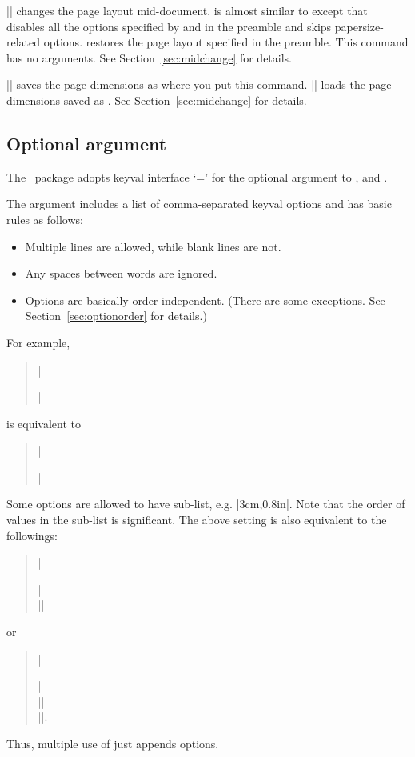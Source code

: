 \medskip
||
changes the page layout mid-document.  is almost
similar to  except that  disables all
the options specified by  and  in
the preamble and skips papersize-related options. 
restores the page layout specified in the preamble. This command
has no arguments. See Section~\ref{sec:midchange} for details.

\medskip
||
saves the page dimensions as  where you put
this command.
||
loads the page dimensions saved as . See
Section~\ref{sec:midchange} for details.

\subsection{Optional argument}

The \Gm\ package adopts \textsf{keyval} interface
`=' for the optional argument to
,  and .

The argument includes a list of comma-separated \textsf{keyval}
options and has basic rules as follows:
\begin{itemize}\setlength{\itemsep}{-.5\parsep}
\item Multiple lines are allowed, while blank lines are not.
\item Any spaces between words are ignored.
\item Options are basically order-independent.
(There are some exceptions. See Section~\ref{sec:optionorder} for details.)
\end{itemize}
 For example,
\begin{quote}
|\usepackage[ a5paper ,  hmargin = { 3cm,|\\
|                .8in } , height|\\
|         =  10in ]{geometry}|
\end{quote}
is equivalent to 
\begin{quote}
  |\usepackage[height=10in,a5paper,hmargin={3cm,0.8in}]{geometry}|
\end{quote}
Some options are allowed to have sub-list, e.g. |{3cm,0.8in}|.
Note that the order of values in the sub-list is significant.
The above setting is also equivalent to the followings:
\begin{quote}
  |\usepackage{geometry}|\\
  ||
\end{quote}
or 
\begin{quote}
  |\usepackage[a5paper]{geometry}|\\
  ||\\
  |\geometry{height=10in}|.
\end{quote}
Thus, multiple use of  just appends options.

